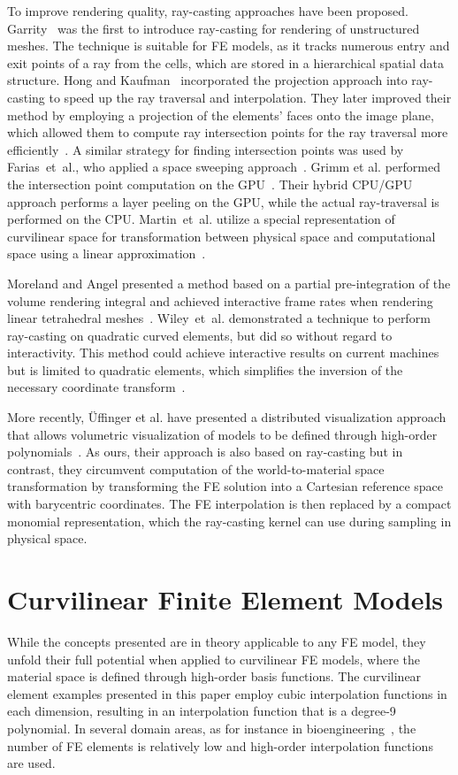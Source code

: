 \documentclass[journal]{vgtc}                %
\begin{document}
To improve rendering quality, ray-casting approaches have been proposed. Garrity~\cite{garrity90RaytracingIrregular} was the first to introduce ray-casting for rendering of unstructured meshes. The technique is suitable for FE models, as it tracks numerous entry and exit points of a ray from the cells, which are stored in a hierarchical spatial data structure. Hong and Kaufman~\cite{hong98curvilinear} incorporated the projection approach into ray-casting to speed up the ray traversal and interpolation. They later improved their method by employing a projection of the elements' faces onto the image plane, which allowed them to compute ray intersection points for the ray traversal more efficiently~\cite{hong99curvilinear}. A similar strategy for finding intersection points was used by Farias~et~al., who applied a space sweeping approach~\cite{farias00zsweep}. Grimm et al. performed the intersection point computation on the GPU~\cite{grimm04curvilinear}. Their hybrid CPU/GPU approach performs a layer peeling on the GPU, while the actual ray-traversal is performed on the CPU. Martin~et~al. utilize a special representation of curvilinear space for transformation between physical space and computational space using a linear approximation~\cite{MartinCurvilinearPacificVIS08}.

Moreland and Angel presented a method based on a partial pre-integration of the volume rendering integral and achieved interactive frame rates when rendering linear tetrahedral meshes~\cite{morelandVolRen04}. Wiley~et~al. demonstrated a technique to perform ray-casting on quadratic curved elements, but did so without regard to interactivity. This method could achieve interactive results on current machines but is limited to quadratic elements, which simplifies the inversion of the necessary coordinate transform~\cite{wileyraycasting04}.

More recently, {\"U}ffinger et al. have presented a distributed visualization approach that allows volumetric visualization of models to be defined through high-order polynomials~\cite{uffinger10femraycasting}. As ours, their approach is also based on ray-casting but in contrast, they circumvent computation of the world-to-material space transformation by transforming the FE solution into a Cartesian reference space with barycentric coordinates. The FE interpolation is then replaced by a compact monomial representation, which the ray-casting kernel can use during sampling in physical space.
%
%
%
\section{Curvilinear Finite Element Models}\label{sec:theory}
While the concepts presented are in theory applicable to any FE model, they unfold their full potential when applied to curvilinear FE models, where the material space is defined through high-order basis functions. The curvilinear element examples presented in this paper employ cubic interpolation functions in each dimension, resulting in an interpolation function that is a degree-9 polynomial. In several domain areas, as for instance in bioengineering~\cite{lee10deformation,wuensche03deformation}, the number of FE elements is relatively low and high-order interpolation functions are used.
\end{document}

